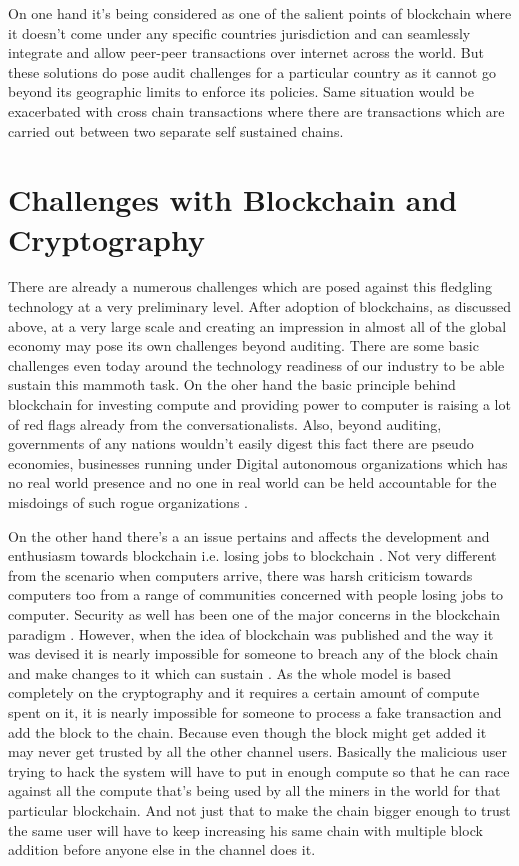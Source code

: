 On one hand it's being considered as one of the salient points of blockchain where it doesn't come under any specific countries jurisdiction and can seamlessly integrate and allow peer-peer transactions over internet across the world. But these solutions do pose audit challenges for a particular country as it cannot go beyond its geographic limits to enforce its policies. Same situation would be exacerbated with cross chain transactions where there are transactions which are carried out between two separate self sustained chains.

\section{Challenges with Blockchain and Cryptography}
There are already a numerous challenges which are posed against this fledgling technology at a very preliminary level. After adoption of blockchains, as discussed above, at a very large scale and creating an impression in almost all of the global economy may pose its own challenges beyond auditing. There are some basic challenges even today around the technology readiness of our industry to be able sustain this mammoth task. On the oher hand the basic principle behind blockchain for investing compute and providing power to computer is raising a lot of red flags already from the conversationalists. Also, beyond auditing, governments of any nations wouldn't easily digest this fact there are pseudo economies, businesses running under Digital autonomous organizations which has no real world presence and no one in real world can be held accountable for the misdoings of such rogue organizations \cite{myungsan33}.

On the other hand there's a an issue pertains and affects the development and enthusiasm towards blockchain i.e. losing jobs to blockchain \cite{michael34}. Not very different from the scenario when computers arrive, there was harsh criticism towards computers too from a range of communities concerned with people losing jobs to computer. Security as well has been one of the major concerns in the blockchain paradigm \cite{mauro35}. However, when the idea of blockchain was published and the way it was devised it is nearly impossible for someone to breach any of the block chain and make changes to it which can sustain \cite{bitcoin12}. As the whole model is based completely on the cryptography and it requires a certain amount of compute spent on it, it is nearly impossible for someone to process a fake transaction and add the block to the chain. Because even though the block might get added it may never get trusted by all the other channel users. Basically the malicious user trying to hack the system will have to put in enough compute so that he can race against all the compute that's being used by all the miners in the world for that particular blockchain. And not just that to make the chain bigger enough to trust the same user will have to keep increasing his same chain with multiple block addition before anyone else in the channel does it.

